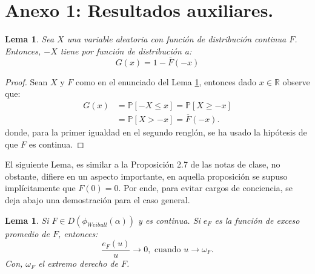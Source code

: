 \documentclass[10.5pt,notitlepage]{article}
\newcommand{\PP}{\mathbb{P}}
\newcommand{\RR}{\mathbb{R}}
\theoremstyle{plain}
\newtheorem{lem}[thm]{Lema} %
\begin{document}
\section{Anexo 1: Resultados auxiliares.}
\begin{lem}\label{lem.1}
Sea \(X\) una variable aleatoria con función de distribución continua \(F\). Entonces, \(-X\) tiene por función de distribución a: 
\[
G(x) = 1 - \overline{F}(-x) 
\]
\end{lem}
\begin{proof}
Sean \(X\) y \(F\) como en el enunciado del Lema \ref{lem.1}, entonces dado \(x\in \RR\) observe que:
\begin{align*}
    G(x) &= \PP[-X \leq x] = \PP[X \geq -x]\\ 
         &= \PP[X > -x] = \overline{F}(-x).
\end{align*}
donde, para la primer igualdad en el segundo renglón, se ha usado la hipótesis de que \(F\) es continua.
\end{proof}
El siguiente Lema, es similar a la Proposición 2.7 de las notas de clase, no obstante, difiere en un aspecto importante, en aquella proposición se supuso implícitamente que \(F(0) = 0\). Por ende, para evitar cargos de conciencia, se deja abajo una demostración para el caso general.
\begin{lem}\label{lem.2}
Si \(F \in D(\phi_{Weibull}(\alpha))\) y es continua. Si \(e_{F}\) es la función de exceso promedio de \(F\), entonces: 
\[
\frac{e_{F}(u)}{u} \to 0, \text{ cuando } u \to \omega_{F}.
\]
Con, \(\omega_{F}\) el extremo derecho de \(F\).
\end{lem}
\end{document}
